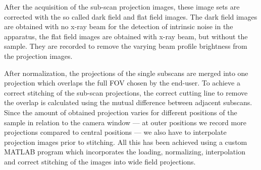 After the acquisition of the sub-scan projection images, these image sets are corrected with the so called dark field and flat field images. The dark field images are obtained with no x-ray beam for the detection of intrinsic noise in the apparatus, the flat field images are obtained with x-ray beam, but without the sample. They are recorded to remove the varying beam profile brightness from the projection images.

After normalization, the projections of the single subscans are merged into one projection which overlaps the full FOV chosen by the end-user. To achieve a correct stitching of the sub-scan projections, the correct cutting line to remove the overlap is calculated using the mutual difference between adjacent subscans. Since the amount of obtained projection varies for different positions of the sample in relation to the camera window --- at outer positions we record more projections compared to central positions --- we also have to interpolate projection images prior to stitching. All this has been achieved using a custom MATLAB\textsuperscript{\textregistered} program which incorporates the loading, normalizing, interpolation and correct stitching of the images into wide field projections.

